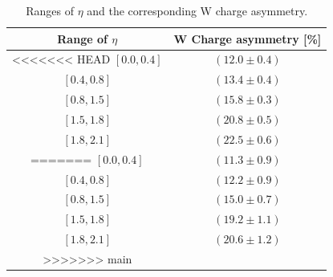 \documentclass[%
 reprint,
 amsmath,amssymb,
 aps,
]{revtex4-2}
\begin{document}
\begin{table}
    \centering
    \begin{tabular}{|c|c|}
    \hline
    Range of $\eta$     & W Charge asymmetry [\%] \\
    \hline
<<<<<<< HEAD
    $[0.0, 0.4]$          & $(12.0 \pm 0.4)$ \\
    $[0.4, 0.8]$          & $(13.4 \pm 0.4)$ \\
    $[0.8, 1.5]$          & $(15.8 \pm 0.3)$ \\
    $[1.5, 1.8]$          & $(20.8 \pm 0.5)$ \\
    $[1.8, 2.1]$          & $(22.5 \pm 0.6)$ \\
=======
    $[0.0, 0.4]$          & $(11.3 \pm 0.9)$ \\
    $[0.4, 0.8]$          & $(12.2 \pm 0.9)$ \\
    $[0.8, 1.5]$          & $(15.0 \pm 0.7)$ \\
    $[1.5, 1.8]$          & $(19.2 \pm 1.1)$ \\
    $[1.8, 2.1]$          & $(20.6 \pm 1.2)$ \\
>>>>>>> main
    \hline
    \end{tabular}
    \caption{Ranges of $\eta$ and the corresponding W charge asymmetry.  }
    \label{tab:asymmetry_etas}
\end{table}
\end{document}
